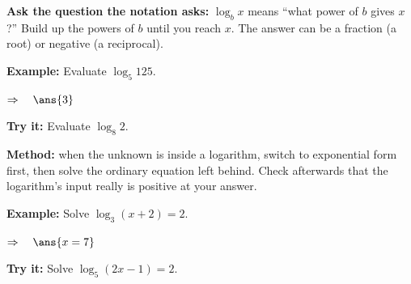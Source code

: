 \documentclass[12pt]{article}
\begin{document}

\begin{formulabox}
\textbf{Ask the question the notation asks:} $\log_b x$ means ``what power of $b$
gives $x$?'' Build up the powers of $b$ until you reach $x$. The answer can be a
fraction (a root) or negative (a reciprocal).
\end{formulabox}

\begin{examplebox}
\textbf{Example:} \quad Evaluate $\log_5 125$.

$\Rightarrow\quad \ans{3}$
\end{examplebox}

\begin{tryitbox}
\textbf{Try it:} \quad Evaluate $\log_8 2$.\\[2pt]
\end{tryitbox}


\begin{formulabox}
\textbf{Method:} when the unknown is inside a logarithm, switch to exponential
form first, then solve the ordinary equation left behind. Check afterwards that
the logarithm's input really is positive at your answer.
\end{formulabox}

\begin{examplebox}
\textbf{Example:} \quad Solve $\log_3(x+2) = 2$.

$\Rightarrow\quad \ans{x = 7}$
\end{examplebox}

\begin{tryitbox}
\textbf{Try it:} \quad Solve $\log_5(2x-1) = 2$.\\[2pt]
\end{tryitbox}
\end{document}

